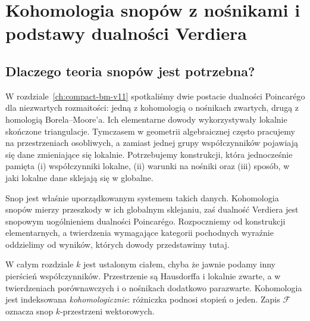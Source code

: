 \chapter{Kohomologia snopów z nośnikami i podstawy dualności Verdiera}
\label{ch:snopy-verdier-v12}

\providecommand{\atlasref}[2]{#2}

\section{Dlaczego teoria snopów jest potrzebna?}
W rozdziale~\ref{ch:compact-bm-v11} spotkaliśmy dwie postacie dualności
Poincarégo dla niezwartych rozmaitości: jedną z kohomologią o nośnikach
zwartych, drugą z homologią Borela--Moore'a. Ich elementarne dowody
wykorzystywały lokalnie skończone triangulacje. Tymczasem w geometrii
algebraicznej często pracujemy na przestrzeniach osobliwych, a zamiast
jednej grupy współczynników pojawiają się dane zmieniające się lokalnie.
Potrzebujemy konstrukcji, która jednocześnie pamięta (i) współczynniki
lokalne, (ii) warunki na nośniki oraz (iii) sposób, w jaki lokalne
dane sklejają się w globalne.

Snop jest właśnie uporządkowanym systemem takich danych. Kohomologia
snopów mierzy przeszkody w ich globalnym sklejaniu, zaś dualność Verdiera
jest snopowym uogólnieniem dualności Poincarégo. Rozpoczniemy od
konstrukcji elementarnych, a twierdzenia wymagające kategorii pochodnych
wyraźnie oddzielimy od wyników, których dowody przedstawimy tutaj.

W całym rozdziale $k$ jest ustalonym ciałem, chyba że jawnie podamy inny
pierścień współczynników. Przestrzenie są Hausdorffa i lokalnie zwarte,
a w twierdzeniach porównawczych i o nośnikach dodatkowo parazwarte.
Kohomologia jest indeksowana \emph{kohomologicznie}: różniczka podnosi
stopień o jeden. Zapis $\mathcal F$ oznacza snop $k$-przestrzeni wektorowych.

